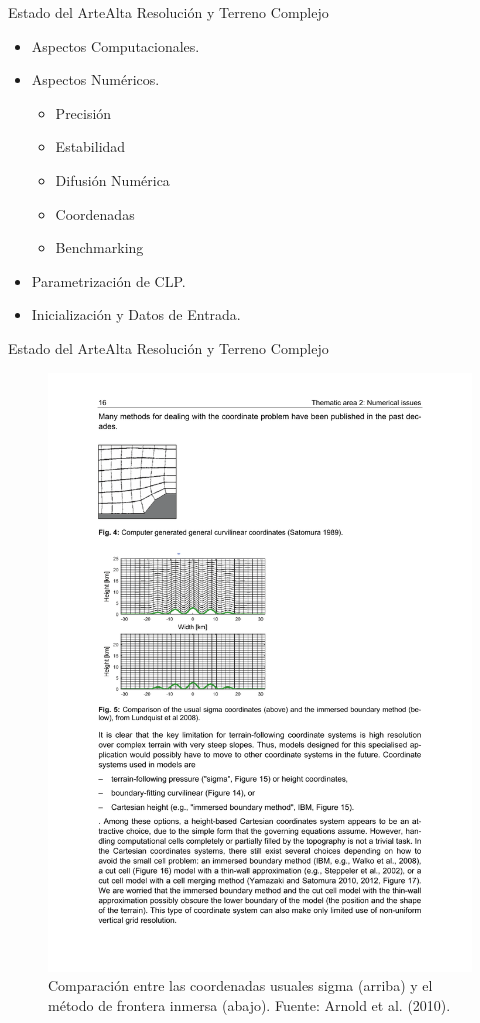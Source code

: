 \documentclass[mathserif,10pt]{beamer}
\begin{document}
\begin{frame}{Estado del Arte}{Alta Resolución y Terreno Complejo}
	\begin{itemize}
		\item Aspectos Computacionales.
		\item Aspectos Numéricos.
		\begin{itemize}
			\item Precisión
			\item Estabilidad
			\item Difusión Numérica
			\item Coordenadas
			\item Benchmarking
		\end{itemize}
		\item Parametrización de CLP.
		\item Inicialización y Datos de Entrada.
	\end{itemize}
\end{frame}

\begin{frame}{Estado del Arte}{Alta Resolución y Terreno Complejo}
	\begin{figure}[h!]
		\centering
		\vspace{0.2cm}
		\includegraphics[width=0.75\linewidth,trim={2.6cm 13.5cm 9.2cm 9cm},clip]{fig/02/coordinates}
		\caption{Comparación entre las coordenadas usuales sigma (arriba) y el método de frontera inmersa (abajo). Fuente: Arnold et al. (2010).}
	\end{figure}
\end{frame}
\end{document}
